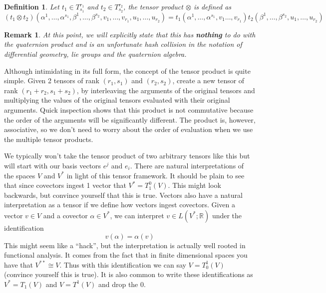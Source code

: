 \documentclass[a4paper]{article}
\newtheorem*{defn}{Definition}
\newtheorem*{rem}{Remark}
\begin{document}
\begin{defn}
  Let $t_1 \in T_{s_1}^{r_1}$ and $t_2 \in T_{s_2}^{r_2}$, the tensor product $\otimes$ is defined as 
  \[
    (t_1 \otimes t_2)(\alpha^1, \dots, \alpha^{s_1}, \beta^{1}, \dots, \beta^{s_2}, v_1, \dots, v_{r_1}, u_1, \dots, u_{r_2}) = t_1(\alpha^1, \dots, \alpha^{s_1}, v_1 \dots, v_{r_1}) t_2(\beta^1, \dots, \beta^{s_2}, u_1, \dots, u_{r_2})
  \]
\end{defn}
\begin{rem}
At this point, we will explicitly state that this has \textbf{nothing} to do with the quaternion product and is an unfortunate hash collision in the notation of differential geometry, lie groups and the quaternion algebra. 
\end{rem}
Although intimidating in its full form, the concept of the tensor product is quite simple. Given 2 tensors of rank $(r_1, s_1)$ and $(r_2, s_2)$, create a new tensor of rank $(r_1 + r_2, s_1 + s_2)$, by interleaving the arguments of the original tensors and multiplying the values of the original tensors evaluated with their original arguments. Quick inspection shows that this product is not commutative because the order of the arguments will be significantly different. The product is, however, associative, so we don't need to worry about the order of evaluation when we use the multiple tensor products.

We typically won't take the tensor product of two arbitrary tensors like this but will start with our basis vectors $e^j$ and $e_i$. There are natural interpretations of the spaces $V$ and $V^*$ in light of this tensor framework. It should be plain to see that since covectors ingest 1 vector that $V^* = T_1^0(V)$. This might look backwards, but convince yourself that this is true. Vectors also have a natural interpretation as a tensor if we define how vectors ingest covectors. Given a vector $v \in V$ and a covector $\alpha \in V^*$, we can interpret $v \in L(V^*; \mathds{R})$ under the identification
\[
  v(\alpha) = \alpha(v)
\]
This might seem like a ``hack'', but the interpretation is actually well rooted in functional analysis. It comes from the fact that in finite dimensional spaces you have that $V^{**} \cong V$. Thus with this identification we can say $V = T^1_0(V)$ (convince yourself this is true). It is also common to write these identifications as $V^* = T_1(V)$ and $V = T^1(V)$ and drop the 0.
\end{document}
